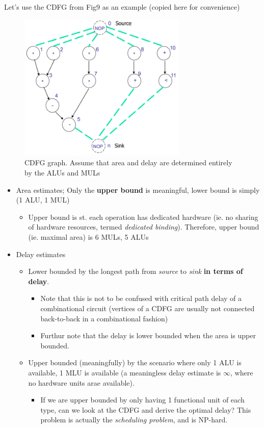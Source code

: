 \documentclass{article}
\begin{document}
Let's use the CDFG from Fig9 as an example (copied here for convenience)
\begin{figure}[htp]
    \centering
    \includegraphics[width=8cm, scale=1]{S1/sequencingGraph.PNG}
    \caption{CDFG graph. Assume that area and delay are determined entirely by the ALUs and MULs}
\end{figure}

\begin{itemize}
    \item Area estimates; Only the \textbf{upper bound} is meaningful, lower bound is simply (1 ALU, 1 MUL)
        \begin{itemize}
            \item Upper bound is st. each operation has dedicated hardware (ie. no sharing of hardware resources, termed \textit{dedicated binding}).
                  Therefore, upper bound (ie. maximal area) is 6 MULs, 5 ALUs
        \end{itemize}
    \item Delay estimates
        \begin{itemize}
            \item Lower bounded by the longest path from \textit{source} to \textit{sink} \textbf{in terms of delay}.

                \begin{itemize}
                    \item Note that this is not to be confused with critical path delay of a combinational circuit (vertices of a CDFG are usually not connected back-to-back in a combinational fashion)
                    \item Furthur note that the delay is lower bounded when the area is upper bounded.
                \end{itemize}
            \item Upper bounded (meaningfully) by the scenario where only 1 ALU is available, 1 MLU is available (a meaningless delay estimate is $\infty$, where no hardware units arae available).
                \begin{itemize}
                    \item If we are upper bounded by only having 1 functional unit of each type, can we look at the CDFG and derive the optimal delay?
                          This problem is actually the \textit{scheduling problem}, and is NP-hard.
                \end{itemize}
        \end{itemize}
\end{itemize}
\end{document}
